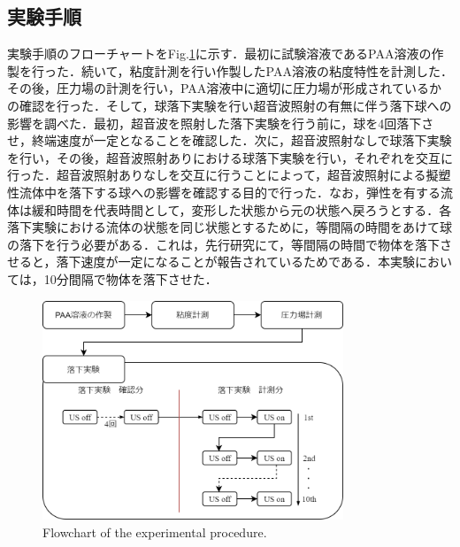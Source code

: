 \newpage

\subsection{実験手順}

実験手順のフローチャートをFig.\ref{fig:exp-methods}に示す．最初に試験溶液であるPAA溶液の作製を行った．続いて，粘度計測を行い作製したPAA溶液の粘度特性を計測した．その後，圧力場の計測を行い，PAA溶液中に適切に圧力場が形成されているかの確認を行った．そして，球落下実験を行い超音波照射の有無に伴う落下球への影響を調べた．最初，超音波を照射した落下実験を行う前に，球を4回落下させ，終端速度が一定となることを確認した．次に，超音波照射なしで球落下実験を行い，その後，超音波照射ありにおける球落下実験を行い，それぞれを交互に行った．超音波照射ありなしを交互に行うことによって，超音波照射による擬塑性流体中を落下する球への影響を確認する目的で行った．なお，弾性を有する流体は緩和時間を代表時間として，変形した状態から元の状態へ戻ろうとする．各落下実験における流体の状態を同じ状態とするために，等間隔の時間をあけて球の落下を行う必要がある．これは，先行研究\cite{ref:8-5}にて，等間隔の時間で物体を落下させると，落下速度が一定になることが報告されているためである．本実験においては，10分間隔で物体を落下させた．

\begin{figure}[ht]
    \centering
    \includegraphics[clip,width=9.0cm]{2-Methods/exp-methods.png}
    \caption{Flowchart of the experimental procedure.}
    \label{fig:exp-methods}
\end{figure}
